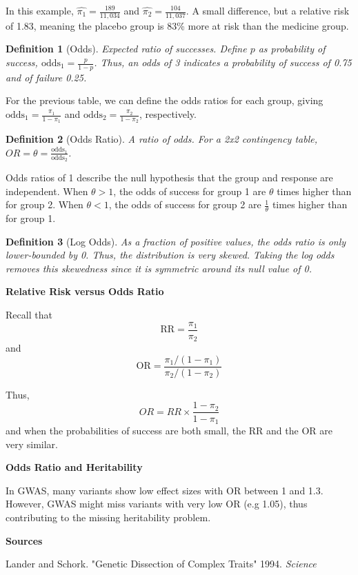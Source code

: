 \documentclass{tufte-handout}
\theoremstyle{noparens}
\newtheorem*{define}{Definition}
\begin{document}
In this example, $\hat{\pi_1} = \frac{189}{11,034}$ and $\hat{\pi_2} = \frac{104}{11,037}$. A small difference, but a relative risk of 1.83, meaning the placebo group is 83\% more at risk than the medicine group.

\begin{define}[Odds]
Expected ratio of successes. Define $p$ as probability of success, $\text{odds}_1 = \frac{p}{1-p}$. Thus, an odds of 3 indicates a probability of success of 0.75 and of failure 0.25.
\end{define}

For the previous table, we can define the odds ratios for each group, giving $\text{odds}_1 = \frac{\pi_1}{1-\pi_1}$ and $\text{odds}_2 = \frac{\pi_2}{1-\pi_2}$, respectively. 

\begin{define}[Odds Ratio]
A ratio of odds. For a 2x2 contingency table, $OR = \theta = \frac{\text{odds}_1}{\text{odds}_2}$.
\end{define}

Odds ratios of 1 describe the null hypothesis that the group and response are independent. When $\theta > 1$, the odds of success for group 1 are $\theta$ times higher than for group 2. When $\theta < 1$, the odds of success for group 2 are $\frac{1}{\theta}$ times higher than for group 1.

\begin{define}[Log Odds]
As a fraction of positive values, the odds ratio is only lower-bounded by 0. Thus, the distribution is very skewed. Taking the log odds removes this skewedness since it is symmetric around its null value of 0.
\end{define}

\textbf{Relative Risk versus Odds Ratio}

Recall that \[ \text{RR} = \frac{\pi_1}{\pi_2} \] and \[ \text{OR} = \frac{\pi_1 / (1-\pi_1)}{\pi_2 / (1-\pi_2)} \]

Thus, \[ OR = RR \times \frac{1-\pi_2}{1-\pi_1} \] and when the probabilities of success are both small, the RR and the OR are very similar.
 
 \noindent
 \textbf{Odds Ratio and Heritability}
 
 In GWAS, many variants show low effect sizes with OR between 1 and 1.3. However, GWAS might miss variants with very low OR (e.g 1.05), thus contributing to the missing heritability problem. 
 
 \textbf{Sources}
 
 Lander and Schork. "Genetic Dissection of Complex Traits" 1994. \emph{Science}
 
\end{document}
